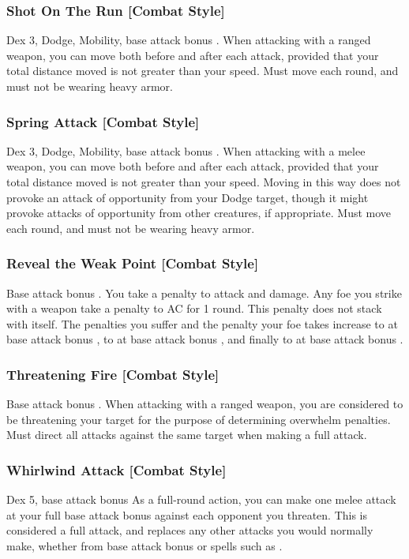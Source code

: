 \subsubsection{Shot On The Run [Combat Style]}
 Dex 3, Dodge, Mobility, base attack bonus .
 When attacking with a ranged weapon, you can move both before and after each attack, provided that your total distance moved is not greater than your speed.
 Must move each round, and must not be wearing heavy armor.

\subsubsection{Spring Attack [Combat Style]}
 Dex 3, Dodge, Mobility, base attack bonus .
 When attacking with a melee weapon, you can move both before and after each attack, provided that your total distance moved is not greater than your speed. Moving in this way does not provoke an attack of opportunity from your Dodge target, though it might provoke attacks of opportunity from other creatures, if appropriate.
 Must move each round, and must not be wearing heavy armor.

\subsubsection{Reveal the Weak Point [Combat Style]}
\featpre Base attack bonus .
 You take a  penalty to attack and damage. Any foe you strike with a weapon take a  penalty to AC for 1 round. This penalty does not stack with itself. The penalties you suffer and the penalty your foe takes increase to  at base attack bonus , to  at base attack bonus , and finally to  at base attack bonus .

\subsubsection{Threatening Fire [Combat Style]}
 Base attack bonus .
 When attacking with a ranged weapon, you are considered to be threatening your target for the purpose of determining overwhelm penalties.
 Must direct all attacks against the same target when making a full attack.

\subsubsection{Whirlwind Attack [Combat Style]}
 Dex 5, base attack bonus 
 As a full-round action, you can make one melee attack at your full base attack bonus against each opponent you threaten. This is considered a full attack, and replaces any other attacks you would normally make, whether from base attack bonus or spells such as .

